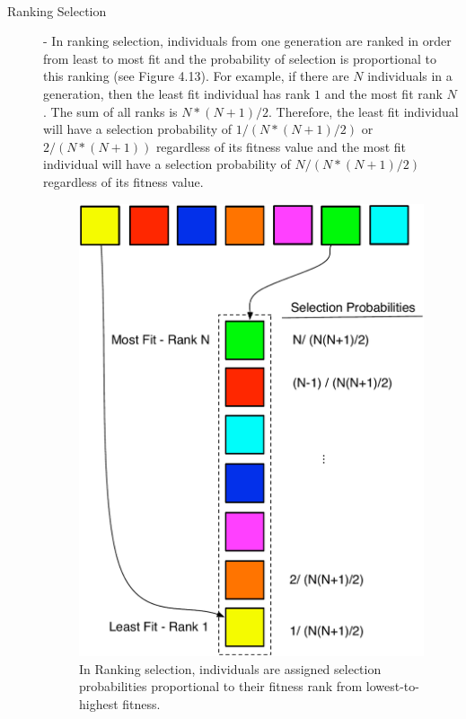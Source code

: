 \documentclass[12pt]{report} 	%
\numberwithin{figure}{chapter}
\numberwithin{table}{chapter}
\numberwithin{equation}{chapter}
\begin{document}
\begin{flushleft}
\begin{description}
\\
\item [Ranking Selection] - In ranking selection, individuals from one generation are ranked in order from least to most fit and the probability of selection is proportional to this ranking (see Figure 4.13). For example, if there are $N$ individuals in a generation, then the least fit individual has rank $1$ and the most fit rank $N$. The sum of all ranks is $N*(N+1)/2$. Therefore, the least fit individual will have a selection probability of $1/(N*(N+1)/2)$ or $2/(N*(N+1))$ regardless of its fitness value and the most fit individual will have a selection probability of $N/(N*(N+1)/2)$ regardless of its fitness value. 
\begin{figure}[h!]
\begin{center}
\includegraphics[scale = 0.6]{RankSelection}
\caption[Ranking selection]{In Ranking selection, individuals are assigned selection probabilities proportional to their fitness rank from lowest-to-highest fitness.}

\end{center}
\end{figure}
\end{description}
\end{flushleft}
\end{document}
